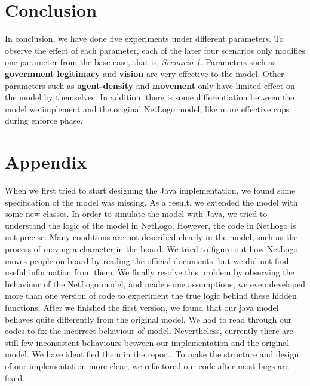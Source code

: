 \documentclass[11pt]{article}
\begin{document}
    \section{Conclusion}
    In conclusion, we have done five experiments under different parameters. To
    observe the effect of each parameter, each of the later four scenarios only modifies
    one parameter from the base case, that is, \textit{Scenario 1}. Parameters such as
    \textbf{government legitimacy} and \textbf{vision} are very effective to the
    model. Other parameters such as \textbf{agent-density} and \textbf{movement}
    only have limited effect on the model by themselves. In addition, there is
    some differentiation between the model we implement and the original NetLogo
    model, like more effective cops during enforce phase. 

    \newpage

    \section{Appendix}
    When we first tried to start designing the Java implementation, we found
    some specification of the model was missing.
    As a result, we extended the model with some new classes. In order to simulate 
    the model with Java, we tried to understand the logic of the model in NetLogo.
    However, the code in NetLogo is not precise. Many conditions are not described 
    clearly in the model, such as the process of moving a character in the board. 
    We tried to figure out how NetLogo moves people on board by reading the official
    documents, but we did not find useful information from them. We finally resolve
    this problem by observing the behaviour of the NetLogo model, and made some
    assumptions, we even developed more than one version of code to experiment the
    true logic behind these hidden functions.
    After we finished the first version, we found that our java model behaves quite differently
    from the original model. We had to read through our codes to fix the incorrect
    behaviour of model. Nevertheless, currently there are still few inconsistent
    behaviours between our implementation and the original model. We have identified
    them in the report.
    To make the structure and design of our implementation more clear, we refactored
    our code after most bugs are fixed. 
    
\end{document}
